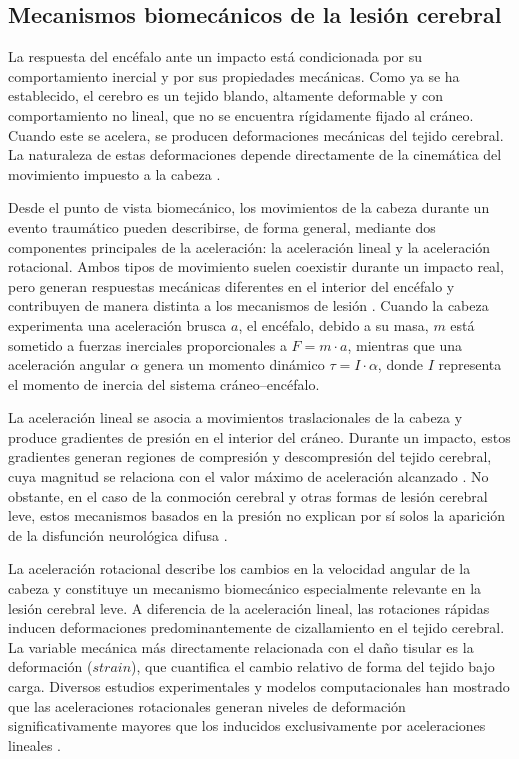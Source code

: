 \subsection{Mecanismos biomecánicos de la lesión cerebral}

La respuesta del encéfalo ante un impacto está condicionada por su comportamiento inercial y por sus propiedades mecánicas. Como ya se ha establecido, el cerebro es un tejido blando, altamente deformable y con comportamiento no lineal, que no se encuentra rígidamente fijado al cráneo. Cuando este se acelera, se producen deformaciones mecánicas del tejido cerebral. La naturaleza de estas deformaciones depende directamente de la cinemática del movimiento impuesto a la cabeza \cite{Meaney2011Biomechanics}.

Desde el punto de vista biomecánico, los movimientos de la cabeza durante un evento traumático pueden describirse, de forma general, mediante dos componentes principales de la aceleración: la aceleración lineal y la aceleración rotacional. Ambos tipos de movimiento suelen coexistir durante un impacto real, pero generan respuestas mecánicas diferentes en el interior del encéfalo y contribuyen de manera distinta a los mecanismos de lesión \cite{Meaney2011Biomechanics}. Cuando la cabeza experimenta una aceleración brusca $a$, el encéfalo, debido a su masa, $m$ está sometido a fuerzas inerciales proporcionales a $F = m \cdot a$, mientras que una aceleración angular $\alpha$ genera un momento dinámico $\tau = I \cdot \alpha$, donde $I$ representa el momento de inercia del sistema cráneo–encéfalo.

La aceleración lineal se asocia a movimientos traslacionales de la cabeza y produce gradientes de presión en el interior del cráneo. Durante un impacto, estos gradientes generan regiones de compresión y descompresión del tejido cerebral, cuya magnitud se relaciona con el valor máximo de aceleración alcanzado \cite{Meaney2011Biomechanics}. No obstante, en el caso de la conmoción cerebral y otras formas de lesión cerebral leve, estos mecanismos basados en la presión no explican por sí solos la aparición de la disfunción neurológica difusa \cite{Meaney2011Biomechanics}.

La aceleración rotacional describe los cambios en la velocidad angular de la cabeza y constituye un mecanismo biomecánico especialmente relevante en la lesión cerebral leve. A diferencia de la aceleración lineal, las rotaciones rápidas inducen deformaciones predominantemente de cizallamiento en el tejido cerebral. La variable mecánica más directamente relacionada con el daño tisular es la deformación ($strain$), que cuantifica el cambio relativo de forma del tejido bajo carga. Diversos estudios experimentales y modelos computacionales han mostrado que las aceleraciones rotacionales generan niveles de deformación significativamente mayores que los inducidos exclusivamente por aceleraciones lineales \cite{Meaney2011Biomechanics}.

